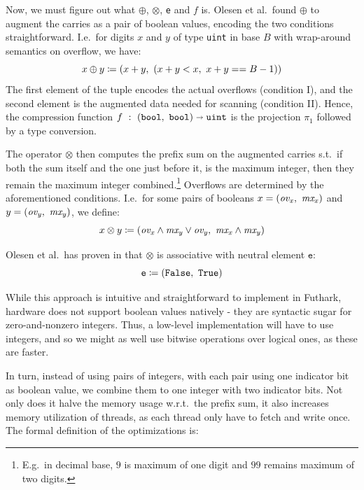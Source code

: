 Now, we must figure out what $\oplus$, $\otimes$, \texttt{e} and $f$ is. Olesen et
al.\ found $\oplus$ to augment the carries as a pair of boolean values, encoding the
two conditions straightforward. I.e.\ for digits $x$ and $y$ of type
\texttt{uint} in base $B$ with wrap-around semantics on overflow, we have:
\begin{equation}
\label{eq:oplus}
x \oplus y \coloneq (x + y,~(x + y < x,~x + y == B-1))
\end{equation}
The first element of the tuple encodes the actual overflows (condition I), and
the second element is the augmented data needed for scanning (condition
II). Hence, the compression function
$f~:~(\mathtt{bool},~\mathtt{bool}) \shortrightarrow \mathtt{uint}$ is the
projection $\pi_1$ followed by a type conversion.

The operator $\otimes$ then computes the prefix sum on the augmented carries s.t.\ if
both the sum itself and the one just before it, is the maximum integer, then
they remain the maximum integer combined.\footnote{E.g.\ in decimal base, $9$ is
  maximum of one digit and $99$ remains maximum of two digits.} Overflows are determined
by the aforementioned conditions. I.e.\ for some pairs of booleans
$x = (\mathit{ov_x},~\mathit{mx_{x}})$ and
$y = (\mathit{ov_y},~\mathit{mx_{y}})$, we define:
\begin{equation}
  \label{eq:otimes}
  x \otimes y \coloneq (\mathit{ov_x} \land \mathit{mx_y} \lor \mathit{ov_y},~\mathit{mx_x} \land \mathit{mx_y})
\end{equation}

Olesen et al.\ has proven in \cite{DPPproject} that $\otimes$ is associative with
neutral element $\mathtt{e}$:
\begin{equation}
  \label{eq:otimesne}
  \mathtt{e} \coloneq (\mathtt{False},~\mathtt{True})
\end{equation}

While this approach is intuitive and straightforward to implement in Futhark,
hardware does not support boolean values natively - they are syntactic sugar for
zero-and-nonzero integers. Thus, a low-level implementation will have to use
integers, and so we might as well use bitwise operations over logical ones, as
these are faster.

In turn, instead of using pairs of integers, with each pair using one indicator
bit as boolean value, we combine them to one integer with two indicator
bits. Not only does it halve the memory usage w.r.t.\ the prefix sum, it also
increases memory utilization of threads, as each thread only have to fetch and
write once. The formal definition of the optimizations is:

